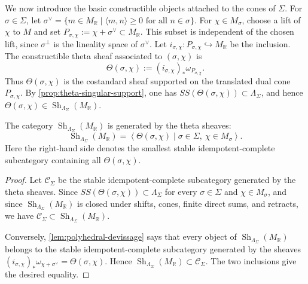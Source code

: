 We now introduce the basic constructible objects attached to the cones of
\(\Sigma\). For \(\sigma\in\Sigma\), let
\(\sigma^\vee=\{m\in M_{\mathbb R}\mid \langle m,n\rangle\ge 0
\text{ for all }n\in\sigma\}\). For \(\chi\in M_\sigma\), choose a lift of
\(\chi\) to \(M\) and set
\(P_{\sigma,\chi}:=\chi+\sigma^\vee\subset M_{\mathbb R}\). This subset is
independent of the chosen lift, since \(\sigma^\perp\) is the lineality space
of \(\sigma^\vee\). Let
\(i_{\sigma,\chi}:P_{\sigma,\chi}\hookrightarrow M_{\mathbb R}\) be the
inclusion. The constructible theta sheaf associated to \((\sigma,\chi)\) is
\[
\Theta(\sigma,\chi):=(i_{\sigma,\chi})_*\omega_{P_{\sigma,\chi}}.
\]
Thus \(\Theta(\sigma,\chi)\) is the costandard sheaf supported on the
translated dual cone \(P_{\sigma,\chi}\). By \cref{prop:theta-singular-support}, one has
\(SS(\Theta(\sigma,\chi))\subset \Lambda_\Sigma\), and hence
\(\Theta(\sigma,\chi)\in
\operatorname{Sh}_{\Lambda_\Sigma}(M_{\mathbb R})\).

\begin{theorem}\label{thm:fltz-generation}
The category \(\operatorname{Sh}_{\Lambda_\Sigma}(M_{\mathbb R})\) is generated
by the theta sheaves:
\[
\operatorname{Sh}_{\Lambda_\Sigma}(M_{\mathbb R})
=
\left\langle
\Theta(\sigma,\chi)\mid \sigma\in\Sigma,\ \chi\in M_\sigma
\right\rangle .
\]
Here the right-hand side denotes the smallest stable idempotent-complete
subcategory containing all \(\Theta(\sigma,\chi)\).
\end{theorem}

\begin{proof}
Let \(\mathcal C_\Sigma\) be the stable idempotent-complete subcategory
generated by the theta sheaves. Since
\(SS(\Theta(\sigma,\chi))\subset \Lambda_\Sigma\) for every
\(\sigma\in\Sigma\) and \(\chi\in M_\sigma\), and since
\(\operatorname{Sh}_{\Lambda_\Sigma}(M_{\mathbb R})\) is closed under shifts,
cones, finite direct sums, and retracts, we have
\(\mathcal C_\Sigma\subset
\operatorname{Sh}_{\Lambda_\Sigma}(M_{\mathbb R})\).

Conversely, \cref{lem:polyhedral-devissage} says that every object of
\(\operatorname{Sh}_{\Lambda_\Sigma}(M_{\mathbb R})\) belongs to the stable
idempotent-complete subcategory generated by the sheaves
\((i_{\sigma,\chi})_*\omega_{\chi+\sigma^\vee}
=\Theta(\sigma,\chi)\). Hence
\(\operatorname{Sh}_{\Lambda_\Sigma}(M_{\mathbb R})\subset
\mathcal C_\Sigma\). The two inclusions give the desired equality.
\end{proof}